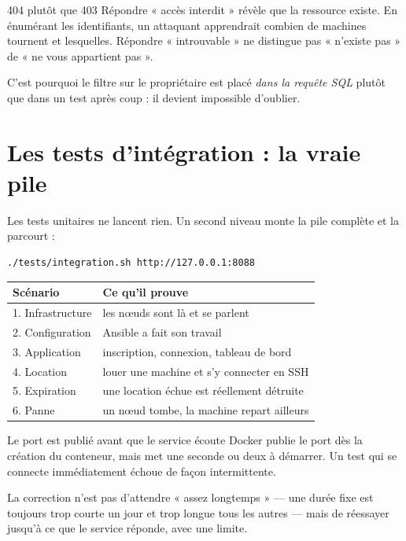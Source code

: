 \begin{notion}{404 plutôt que 403}
Répondre « accès interdit » révèle que la ressource existe. En énumérant les
identifiants, un attaquant apprendrait combien de machines tournent et
lesquelles. Répondre « introuvable » ne distingue pas « n'existe pas » de
« ne vous appartient pas ».

C'est pourquoi le filtre sur le propriétaire est placé \emph{dans la requête
SQL} plutôt que dans un test après coup : il devient impossible d'oublier.
\end{notion}

\section{Les tests d'intégration : la vraie pile}

Les tests unitaires ne lancent rien. Un second niveau monte la pile complète et
la parcourt :

\begin{lstlisting}[language=bash]
./tests/integration.sh http://127.0.0.1:8088
\end{lstlisting}

\begin{center}
\small
\begin{tabularx}{\textwidth}{@{}lX@{}}
\toprule
\textbf{Scénario} & \textbf{Ce qu'il prouve} \\
\midrule
1. Infrastructure & les nœuds sont là et se parlent \\
2. Configuration & Ansible a fait son travail \\
3. Application & inscription, connexion, tableau de bord \\
4. Location & louer une machine et s'y connecter en SSH \\
5. Expiration & une location échue est réellement détruite \\
6. Panne & un nœud tombe, la machine repart ailleurs \\
\bottomrule
\end{tabularx}
\end{center}

\begin{piege}{Le port est publié avant que le service écoute}
Docker publie le port dès la création du conteneur, mais  met une
seconde ou deux à démarrer. Un test qui se connecte immédiatement échoue de
façon intermittente.

La correction n'est pas d'attendre « assez longtemps » --- une durée fixe est
toujours trop courte un jour et trop longue tous les autres --- mais de
réessayer jusqu'à ce que le service réponde, avec une limite.
\end{piege}

